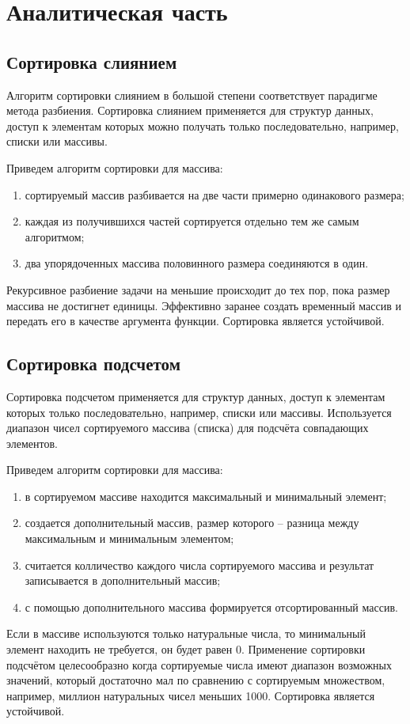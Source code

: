\chapter{Аналитическая часть}

\section{Сортировка слиянием}

Алгоритм сортировки слиянием в большой степени соответствует парадигме метода разбиения. \cite{cormen}
Сортировка слиянием применяется для структур данных, доступ к элементам которых можно получать только последовательно, например, списки или массивы.

Приведем алгоритм сортировки для массива:
\begin{enumerate}
	\item сортируемый массив разбивается на две части примерно одинакового размера;
	\item каждая из получившихся частей сортируется отдельно тем же самым алгоритмом; 
	\item два упорядоченных массива половинного размера соединяются в один.
\end{enumerate}
Рекурсивное разбиение задачи на меньшие происходит до тех пор, пока размер массива не достигнет единицы. Эффективно заранее создать временный массив и передать его в качестве аргумента функции. Сортировка является устойчивой.

\section{Сортировка подсчетом}

Сортировка подсчетом применяется для структур данных, доступ к элементам которых только последовательно, например, списки или массивы. Используется диапазон чисел сортируемого массива (списка) для подсчёта совпадающих элементов.\cite{knut} 

Приведем алгоритм сортировки для массива:
\begin{enumerate}
	\item в сортируемом массиве находится максимальный и минимальный элемент;
	\item создается дополнительный массив, размер которого -- разница между максимальным и минимальным элементом;
	\item считается колличество каждого числа сортируемого массива и результат записывается в дополнительный массив;
	\item с помощью дополнительного массива формируется отсортированный массив.
\end{enumerate}
Если в массиве используются только натуральные числа, то минимальный элемент находить не требуется, он будет равен 0. Применение сортировки подсчётом целесообразно когда сортируемые числа имеют диапазон возможных значений, который достаточно мал по сравнению с сортируемым множеством, например, миллион натуральных чисел меньших 1000. Сортировка является устойчивой.


